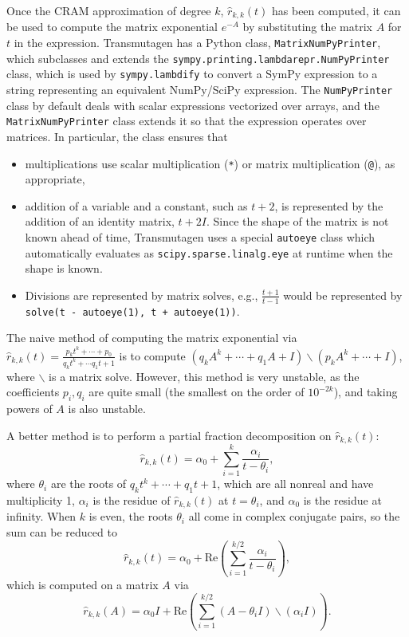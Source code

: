 Once the CRAM approximation of degree $k$, $\hat{r}_{k, k}(t)$ has been
computed, it can be used to compute the matrix exponential $e^{-A}$ by
substituting the matrix $A$ for $t$ in the expression. Transmutagen has a
Python class, \texttt{MatrixNumPyPrinter}, which subclasses and extends the
\texttt{sympy.printing.lambdarepr.NumPyPrinter} class, which is used by
\texttt{sympy.lambdify} to convert a SymPy expression to a string representing
an equivalent NumPy/SciPy expression. The \texttt{NumPyPrinter} class by
default deals with scalar expressions vectorized over arrays, and the
\texttt{MatrixNumPyPrinter} class extends it so that the expression operates
over matrices. In particular, the class ensures that

\begin{itemize}
\item multiplications use scalar multiplication (\texttt{*}) or
  matrix multiplication (\texttt{@}), as appropriate,
\item addition of a variable and a constant, such as $t + 2$, is represented
  by the addition of an identity matrix, $t + 2I$. Since the shape of the
  matrix is not known ahead of time, Transmutagen uses a special
  \texttt{autoeye} class which automatically evaluates as \texttt{scipy.sparse.linalg.eye} at runtime when the shape is known.
\item Divisions are represented by matrix solves, e.g., $\frac{t + 1}{t - 1}$
  would be represented by \texttt{solve(t - autoeye(1), t + autoeye(1))}.
\end{itemize}

The naive method of computing the matrix exponential via $\hat{r}_{k,
  k}(t)=\frac{p_kt^k + \cdots + p_0}{q_kt^k + \cdots q_1t + 1}$
is to compute $(q_kA^k + \cdots + q_1A + I)\backslash(p_kA^k + \cdots + I)$, where
$\backslash$ is a matrix solve. However, this method is very unstable, as the
coefficients $p_i,q_i$ are quite small (the smallest on the order of
$10^{-2k}$), and taking powers of $A$ is also unstable.

A better method is to perform a partial fraction decomposition on $\hat{r}_{k,
  k}(t)$:
\begin{equation}
  \hat{r}_{k, k}(t) = \alpha_0 + \sum_{i=1}^k \frac{\alpha_i}{t - \theta_i},
\end{equation}
where $\theta_i$ are the roots of $q_kt^k + \cdots + q_1t + 1$, which are all
nonreal and have multiplicity 1, $\alpha_i$ is the residue of
$\hat{r}_{k, k}(t)$ at $t=\theta_i$, and $\alpha_0$ is the residue at
infinity. When $k$ is even, the roots $\theta_i$ all come in complex conjugate
pairs, so the sum can be reduced to
\begin{equation}
  \hat{r}_{k, k}(t) = \alpha_0 + \mathrm{Re}\left(\sum_{i=1}^{k/2} \frac{\alpha_i}{t - \theta_i}\right),
\end{equation}
which is computed on a matrix $A$ via
\begin{equation}
  \hat{r}_{k, k}(A) = \alpha_0I + \mathrm{Re}\left(\sum_{i=1}^{k/2} (A -
    \theta_i I)\backslash(\alpha_i I) \right).
\end{equation}

